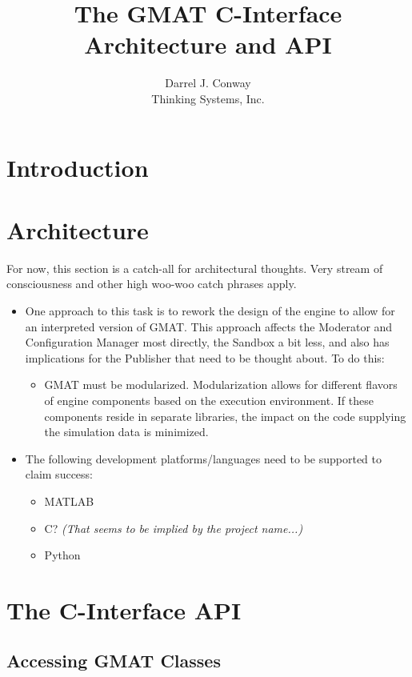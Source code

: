 \documentclass[10pt,letterpaper,titlepage]{article}
\title{The GMAT C-Interface Architecture and API}
\author{Darrel J. Conway\\Thinking Systems, Inc.}
\begin{document}
\maketitle
{}

\section{Introduction}

\section{Architecture}

For now, this section is a catch-all for architectural thoughts.  Very stream of consciousness and other high woo-woo catch phrases apply.

\begin{itemize}
\item One approach to this task is to rework the design of the engine to allow for an interpreted version of GMAT.  This approach affects the Moderator and Configuration Manager most directly, the Sandbox a bit less, and also has implications for the Publisher that need to be thought about.  To do this:
\begin{itemize}
\item GMAT must be modularized.  Modularization allows for different flavors of engine components based on the execution environment.  If these components reside in separate libraries, the impact on the code supplying the simulation data is minimized.
\end{itemize}
\item The following development platforms/languages need to be supported to claim success:
\begin{itemize}
\item MATLAB
\item C?  \textit{(That seems to be implied by the project name...)}
\item Python
\end{itemize}
\end{itemize}

\section{The C-Interface API}

\subsection{Accessing GMAT Classes}
\end{document}
